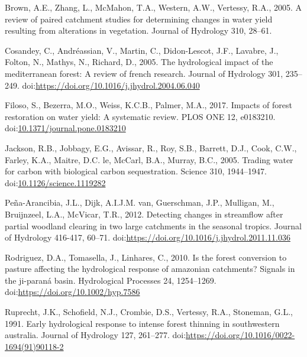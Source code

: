 \documentclass[]{elsarticle} %
\begin{document}
\leavevmode\hypertarget{ref-brown2005}{}%
Brown, A.E., Zhang, L., McMahon, T.A., Western, A.W., Vertessy, R.A.,
2005. A review of paired catchment studies for determining changes in
water yield resulting from alterations in vegetation. Journal of
Hydrology 310, 28--61.

\leavevmode\hypertarget{ref-cosandey2005}{}%
Cosandey, C., Andréassian, V., Martin, C., Didon-Lescot, J.F., Lavabre,
J., Folton, N., Mathys, N., Richard, D., 2005. The hydrological impact
of the mediterranean forest: A review of french research. Journal of
Hydrology 301, 235--249.
doi:\href{https://doi.org/https://doi.org/10.1016/j.jhydrol.2004.06.040}{https://doi.org/10.1016/j.jhydrol.2004.06.040}

\leavevmode\hypertarget{ref-filoso2017}{}%
Filoso, S., Bezerra, M.O., Weiss, K.C.B., Palmer, M.A., 2017. Impacts of
forest restoration on water yield: A systematic review. PLOS ONE 12,
e0183210.
doi:\href{https://doi.org/10.1371/journal.pone.0183210}{10.1371/journal.pone.0183210}

\leavevmode\hypertarget{ref-jackson2005}{}%
Jackson, R.B., Jobbagy, E.G., Avissar, R., Roy, S.B., Barrett, D.J.,
Cook, C.W., Farley, K.A., Maitre, D.C. le, McCarl, B.A., Murray, B.C.,
2005. Trading water for carbon with biological carbon sequestration.
Science 310, 1944--1947.
doi:\href{https://doi.org/10.1126/science.1119282}{10.1126/science.1119282}

\leavevmode\hypertarget{ref-pena-arancibia2012}{}%
Peña-Arancibia, J.L., Dijk, A.I.J.M. van, Guerschman, J.P., Mulligan,
M., Bruijnzeel, L.A., McVicar, T.R., 2012. Detecting changes in
streamflow after partial woodland clearing in two large catchments in
the seasonal tropics. Journal of Hydrology 416-417, 60--71.
doi:\href{https://doi.org/https://doi.org/10.1016/j.jhydrol.2011.11.036}{https://doi.org/10.1016/j.jhydrol.2011.11.036}

\leavevmode\hypertarget{ref-rodriguez2010}{}%
Rodriguez, D.A., Tomasella, J., Linhares, C., 2010. Is the forest
conversion to pasture affecting the hydrological response of amazonian
catchments? Signals in the ji-paraná basin. Hydrological Processes 24,
1254--1269.
doi:\href{https://doi.org/https://doi.org/10.1002/hyp.7586}{https://doi.org/10.1002/hyp.7586}

\leavevmode\hypertarget{ref-ruprechtetal1991}{}%
Ruprecht, J.K., Schofield, N.J., Crombie, D.S., Vertessy, R.A.,
Stoneman, G.L., 1991. Early hydrological response to intense forest
thinning in southwestern australia. Journal of Hydrology 127, 261--277.
doi:\href{https://doi.org/https://doi.org/10.1016/0022-1694(91)90118-2}{https://doi.org/10.1016/0022-1694(91)90118-2}
\end{document}
